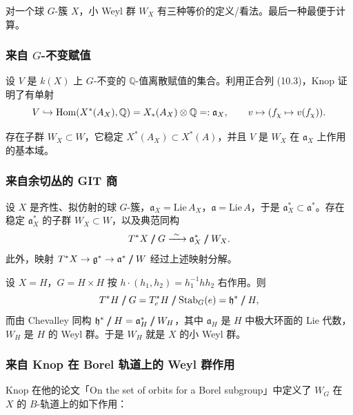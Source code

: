 对一个球 $G$-簇 $X$，小 Weyl 群 $W_X$ 有三种等价的定义/看法。最后一种最便于计算。

\subsubsection{来自 $G$-不变赋值}

设 $V$ 是 $k(X)$ 上 $G$-不变的 $\mathbb Q$-值离散赋值的集合。利用正合列 (10.3)，Knop 证明了有单射
\[
  V\hookrightarrow\operatorname{Hom}(X^*(A_X),\mathbb Q)=X_*(A_X)\otimes\mathbb Q=:\mathfrak a_X,\qquad v\mapsto(f_\chi\mapsto v(f_\chi)).
\]

\begin{prop}
存在子群 $W_X\subset W$，它稳定 $X^*(A_X)\subset X^*(A)$，并且 $V$ 是 $W_X$ 在 $\mathfrak a_X$ 上作用的基本域。
\end{prop}

\subsubsection{来自余切丛的 GIT 商}

\begin{prop}
[Knop]
设 $X$ 是齐性、拟仿射的球 $G$-簇，$\mathfrak a_X=\mathrm{Lie}\,A_X$，$\mathfrak a=\mathrm{Lie}\,A$，于是 $\mathfrak a_X^*\subset\mathfrak a^*$。存在稳定 $\mathfrak a_X^*$ 的子群 $W_X\subset W$，以及典范同构
\[
  T^*X\mathrel{/\mkern-10mu/} G\xrightarrow{\ \sim\ } \mathfrak a_X^*\mathrel{/\mkern-10mu/} W_X.
\]
此外，映射 $T^*X\to\mathfrak g^*\to\mathfrak a^*\mathrel{/\mkern-10mu/} W$ 经过上述映射分解。
\end{prop}

\begin{exmp}
[群情形]
设 $X=H$，$G=H\times H$ 按 $h\cdot(h_1,h_2)=h_1^{-1}hh_2$ 右作用。则
\[
  T^*H\mathrel{/\mkern-10mu/} G=T^*_eH\mathrel{/\mkern-10mu/}\mathrm{Stab}_G(e)=\mathfrak h^*\mathrel{/\mkern-10mu/} H,
\]
而由 Chevalley 同构 $\mathfrak h^*\mathrel{/\mkern-10mu/} H=\mathfrak a_H^*\mathrel{/\mkern-10mu/} W_H$，其中 $\mathfrak a_H$ 是 $H$ 中极大环面的 Lie 代数，$W_H$ 是 $H$ 的 Weyl 群。于是 $W_H$ 就是 $X$ 的小 Weyl 群。
\end{exmp}

\subsubsection{来自 Knop 在 Borel 轨道上的 Weyl 群作用}

Knop 在他的论文「On the set of orbits for a Borel subgroup」中定义了 $W_G$ 在 $X$ 的 $B$-轨道上的如下作用：

